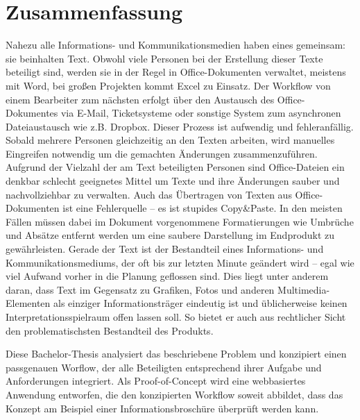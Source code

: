 \section*{Zusammenfassung}

Nahezu alle Informations- und Kommunikationsmedien haben eines gemeinsam: sie beinhalten Text. Obwohl viele Personen bei der Erstellung dieser Texte beteiligt sind, werden sie in der Regel in Office-Dokumenten verwaltet, meistens mit Word, bei großen Projekten kommt Excel zu Einsatz. Der Workflow von einem Bearbeiter zum nächsten erfolgt über den Austausch des Office-Dokumentes via E-Mail, Ticketsysteme oder sonstige System zum asynchronen Dateiaustausch wie z.B. Dropbox. Dieser Prozess ist aufwendig und fehleranfällig. Sobald mehrere Personen gleichzeitig an den Texten arbeiten, wird manuelles Eingreifen notwendig um die gemachten Änderungen zusammenzuführen. Aufgrund der Vielzahl der am Text beteiligten Personen sind Office-Dateien ein denkbar schlecht geeignetes Mittel um Texte und ihre Änderungen sauber und nachvollziehbar zu verwalten. Auch das Übertragen von Texten aus Office-Dokumenten ist eine Fehlerquelle – es ist stupides Copy\&\-Paste. In den meisten Fällen müssen dabei im Dokument vorgenommene Formatierungen wie Umbrüche und Absätze entfernt werden um eine saubere Darstellung im Endprodukt zu gewährleisten. Gerade der Text ist der Bestandteil eines Informations- und Kommunikationsmediums, der oft bis zur letzten Minute geändert wird – egal wie viel Aufwand vorher in die Planung geflossen sind. Dies liegt unter anderem daran, dass Text im Gegensatz zu Grafiken, Fotos und anderen Multimedia-Elementen als einziger Informationsträger eindeutig ist und üblicherweise keinen Interpretationsspielraum offen lassen soll. So bietet er auch aus rechtlicher Sicht den problematischsten Bestandteil des Produkts.

Diese Bachelor-Thesis analysiert das beschriebene Problem und konzipiert einen passgenauen Worflow, der alle Beteiligten entsprechend ihrer Aufgabe und Anforderungen integriert. Als Proof-of-Concept wird eine webbasiertes Anwendung entworfen, die den konzipierten Workflow soweit abbildet, dass das Konzept am Beispiel einer Informationsbroschüre überprüft werden kann. 


